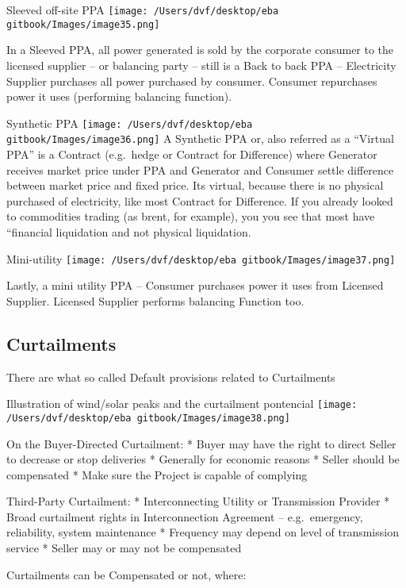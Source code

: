 \documentclass[]{book}
\theoremstyle{definition}
\theoremstyle{definition}
\theoremstyle{definition}
\theoremstyle{remark}
\begin{document}
Sleeved off-site PPA
\texttt{[image: /Users/dvf/desktop/eba gitbook/Images/image35.png]}

In a Sleeved PPA, all power generated is sold by the corporate consumer
to the licensed supplier -- or balancing party -- still is a Back to
back PPA -- Electricity Supplier purchases all power purchased by
consumer. Consumer repurchases power it uses (performing balancing
function).

Synthetic PPA
\texttt{[image: /Users/dvf/desktop/eba gitbook/Images/image36.png]}
A Synthetic PPA or, also referred as a ``Virtual PPA'' is a Contract
(e.g.~hedge or Contract for Difference) where Generator receives market
price under PPA and Generator and Consumer settle difference between
market price and fixed price. Its virtual, because there is no physical
purchased of electricity, like most Contract for Difference. If you
already looked to commodities trading (as brent, for example), you you
see that most have ``financial liquidation and not physical liquidation.

Mini-utility
\texttt{[image: /Users/dvf/desktop/eba gitbook/Images/image37.png]}

Lastly, a mini utility PPA -- Consumer purchases power it uses from
Licensed Supplier. Licensed Supplier performs balancing Function too.

\subsection{Curtailments}\label{curtailments}

There are what so called Default provisions related to Curtailments

Illustration of wind/solar peaks and the curtailment pontencial
\texttt{[image: /Users/dvf/desktop/eba gitbook/Images/image38.png]}

On the Buyer-Directed Curtailment: * Buyer may have the right to direct
Seller to decrease or stop deliveries * Generally for economic reasons *
Seller should be compensated * Make sure the Project is capable of
complying

Third-Party Curtailment: * Interconnecting Utility or Transmission
Provider * Broad curtailment rights in Interconnection Agreement --
e.g.~emergency, reliability, system maintenance * Frequency may depend
on level of transmission service * Seller may or may not be compensated

Curtailments can be Compensated or not, where:
\end{document}
